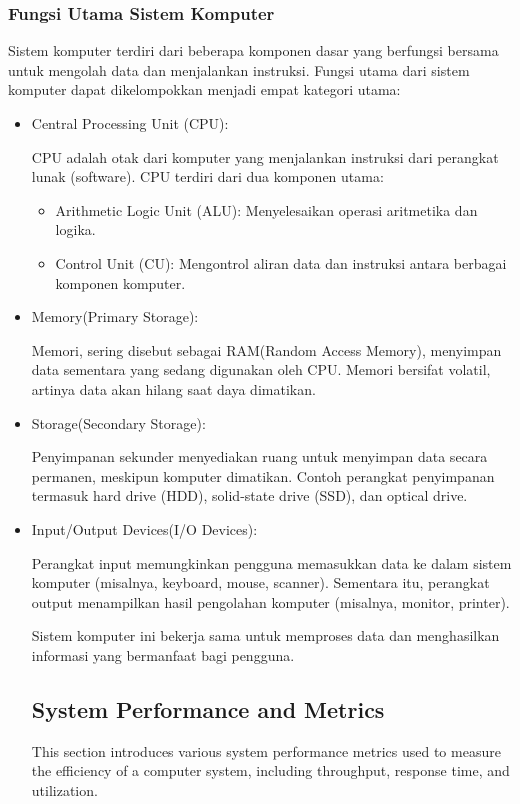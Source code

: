 \documentclass[12pt]{article}
\begin{document}
\subsubsection{Fungsi Utama Sistem Komputer}
\par
Sistem komputer terdiri dari beberapa komponen dasar yang berfungsi bersama untuk mengolah data dan menjalankan instruksi. Fungsi utama dari sistem komputer dapat dikelompokkan menjadi empat kategori utama:
\begin{itemize}
    \item Central Processing Unit (CPU):
    \par
    CPU adalah otak dari komputer yang menjalankan instruksi dari perangkat lunak (software). CPU terdiri dari dua komponen utama:
    \begin{itemize}
        \item 	Arithmetic Logic Unit (ALU): Menyelesaikan operasi aritmetika dan logika.
        \item 	Control Unit (CU): Mengontrol aliran data dan instruksi antara berbagai komponen komputer.
    \end{itemize}
    \item Memory(Primary Storage):
    \par Memori, sering disebut sebagai RAM(Random Access Memory), menyimpan data sementara yang sedang digunakan oleh CPU. Memori bersifat volatil, artinya data akan hilang saat daya dimatikan.
    \item Storage(Secondary Storage):
    \par Penyimpanan sekunder menyediakan ruang untuk menyimpan data secara permanen, meskipun komputer dimatikan. Contoh perangkat penyimpanan termasuk hard drive (HDD), solid-state drive (SSD), dan optical drive.
    \item Input/Output Devices(I/O Devices):
    \par Perangkat input memungkinkan pengguna memasukkan data ke dalam sistem komputer (misalnya, keyboard, mouse, scanner). Sementara itu, perangkat output menampilkan hasil pengolahan komputer (misalnya, monitor, printer).
    \par Sistem komputer ini bekerja sama untuk memproses data dan menghasilkan informasi yang bermanfaat bagi pengguna.

\subsection{System Performance and Metrics}
This section introduces various system performance metrics used to measure the efficiency of a computer system, including throughput, response time, and utilization.


\end{itemize}
\end{document}
